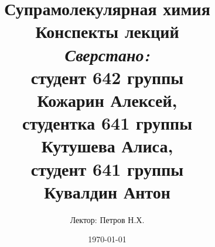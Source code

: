 
\author{Лектор: Петров Н.Х.}



\title{
	\textbf{Супрамолекулярная химия} \\
	\vspace{1in}
	{Конспекты лекций} \\
	\vspace{2.5in}
	\raggedleft \large \emph{Сверстано:}\\ 
		студент 642 группы\\ 
		Кожарин Алексей, \\
		студентка 641 группы \\
		Кутушева Алиса,\\
		студент 641 группы\\
		Кувалдин Антон
}

\date{\today} %

